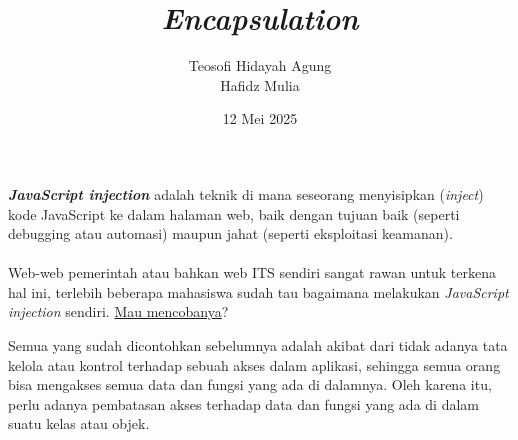 \documentclass{../praktikum-ppt}
\author[Tew \& Haf]{Teosofi Hidayah Agung \\ Hafidz Mulia}
\date{12 Mei 2025}
\title[Alpro 2 - Week 7]{\textit{Encapsulation}}
\institute[Matematika ITS]{Departemen Matematika\\ Institut Teknologi Sepuluh Nopember}
\begin{document}
{
\begin{frame}
  \titlepage
\end{frame}
}


    { 
      \begin{frame}
      \textbf{\textit{JavaScript injection}} adalah teknik di mana seseorang menyisipkan (\textit{inject}) kode JavaScript ke dalam halaman web, baik dengan tujuan baik (seperti debugging atau automasi) maupun jahat (seperti eksploitasi keamanan).\\~\\

      Web-web pemerintah atau bahkan web ITS sendiri sangat rawan untuk terkena hal ini, terlebih beberapa mahasiswa sudah tau bagaimana melakukan \textit{JavaScript injection} sendiri. \underline{Mau mencobanya}?
    \end{frame}
    
    \begin{frame}
      \begin{masalah}
        Semua yang sudah dicontohkan sebelumnya adalah akibat dari tidak adanya tata kelola atau kontrol terhadap sebuah akses dalam aplikasi, sehingga semua orang bisa mengakses semua data dan fungsi yang ada di dalamnya. Oleh karena itu, perlu adanya pembatasan akses terhadap data dan fungsi yang ada di dalam suatu kelas atau objek.
      \end{masalah}
    \end{frame}
    }
\end{document}
